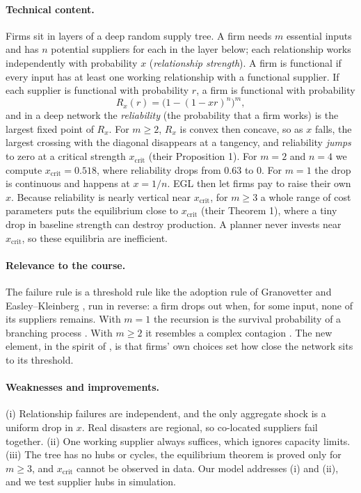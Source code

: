 \documentclass[10pt]{article}
\newcommand{\xc}{x_{\mathrm{crit}}}
\begin{document}
\paragraph{Technical content.} Firms sit in layers of a deep random supply tree. A firm needs $m$ essential inputs and has $n$ potential suppliers for each in the layer below; each relationship works independently with probability $x$ (\emph{relationship strength}). A firm is functional if every input has at least one working relationship with a functional supplier. If each supplier is functional with probability $r$, a firm is functional with probability
\begin{equation}
R_x(r) = \bigl(1-(1-xr)^n\bigr)^m ,
\label{eq:egl}
\end{equation}
and in a deep network the \emph{reliability} (the probability that a firm works) is the largest fixed point of $R_x$. For $m\ge 2$, $R_x$ is convex then concave, so as $x$ falls, the largest crossing with the diagonal disappears at a tangency, and reliability \emph{jumps} to zero at a critical strength $\xc$ (their Proposition 1). For $m=2$ and $n=4$ we compute $\xc=0.518$, where reliability drops from $0.63$ to $0$. For $m=1$ the drop is continuous and happens at $x=1/n$. EGL then let firms pay to raise their own $x$. Because reliability is nearly vertical near $\xc$, for $m\ge3$ a whole range of cost parameters puts the equilibrium close to $\xc$ (their Theorem 1), where a tiny drop in baseline strength can destroy production. A planner never invests near $\xc$, so these equilibria are inefficient.

\paragraph{Relevance to the course.} The failure rule is a threshold rule like the adoption rule of Granovetter \cite{granovetter1978} and Easley--Kleinberg \cite[\S19.2]{ek2010}, run in reverse: a firm drops out when, for some input, none of its suppliers remains. With $m=1$ the recursion is the survival probability of a branching process \cite[\S21.8]{ek2010}. With $m\ge2$ it resembles a complex contagion \cite{centola2007}. The new element, in the spirit of \cite{kleinberg2007}, is that firms' own choices set how close the network sits to its threshold.

\paragraph{Weaknesses and improvements.} (i) Relationship failures are independent, and the only aggregate shock is a uniform drop in $x$. Real disasters are regional, so co-located suppliers fail together. (ii) One working supplier always suffices, which ignores capacity limits. (iii) The tree has no hubs or cycles, the equilibrium theorem is proved only for $m\ge3$, and $\xc$ cannot be observed in data. Our model addresses (i) and (ii), and we test supplier hubs in simulation.
\end{document}
